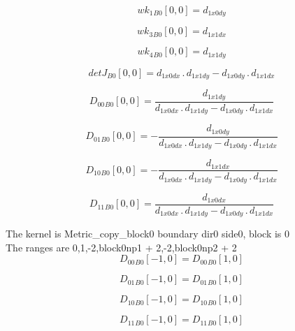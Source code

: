 \documentclass{article}
\begin{document}
\begin{dmath}{wk_{1}{_{B0}}}[{0,0}] = d_{1 x0 dy}\end{dmath}

\begin{dmath}{wk_{3}{_{B0}}}[{0,0}] = d_{1 x1 dx}\end{dmath}

\begin{dmath}{wk_{4}{_{B0}}}[{0,0}] = d_{1 x1 dy}\end{dmath}

\begin{dmath}{detJ{_{B0}}}[{0,0}] = d_{1 x0 dx} \,.\, d_{1 x1 dy} - d_{1 x0 dy} \,.\, d_{1 x1 dx}\end{dmath}

\begin{dmath}{D_{00}{_{B0}}}[{0,0}] = \frac{d_{1 x1 dy}}{d_{1 x0 dx} \,.\, d_{1 x1 dy} - d_{1 x0 dy} \,.\, d_{1 x1 dx}}\end{dmath}

\begin{dmath}{D_{01}{_{B0}}}[{0,0}] = - \frac{d_{1 x0 dy}}{d_{1 x0 dx} \,.\, d_{1 x1 dy} - d_{1 x0 dy} \,.\, d_{1 x1 dx}}\end{dmath}

\begin{dmath}{D_{10}{_{B0}}}[{0,0}] = - \frac{d_{1 x1 dx}}{d_{1 x0 dx} \,.\, d_{1 x1 dy} - d_{1 x0 dy} \,.\, d_{1 x1 dx}}\end{dmath}

\begin{dmath}{D_{11}{_{B0}}}[{0,0}] = \frac{d_{1 x0 dx}}{d_{1 x0 dx} \,.\, d_{1 x1 dy} - d_{1 x0 dy} \,.\, d_{1 x1 dx}}\end{dmath}

\noindent The kernel is Metric_copy_block0 boundary dir0 side0, block is 0\\\noindent The ranges are 0,1,-2,block0np1 + 2,-2,block0np2 + 2\\\begin{dmath}{D_{00}{_{B0}}}[{-1,0}] = {D_{00}{_{B0}}}[{1,0}]\end{dmath}

\begin{dmath}{D_{01}{_{B0}}}[{-1,0}] = {D_{01}{_{B0}}}[{1,0}]\end{dmath}

\begin{dmath}{D_{10}{_{B0}}}[{-1,0}] = {D_{10}{_{B0}}}[{1,0}]\end{dmath}

\begin{dmath}{D_{11}{_{B0}}}[{-1,0}] = {D_{11}{_{B0}}}[{1,0}]\end{dmath}
\end{document}
